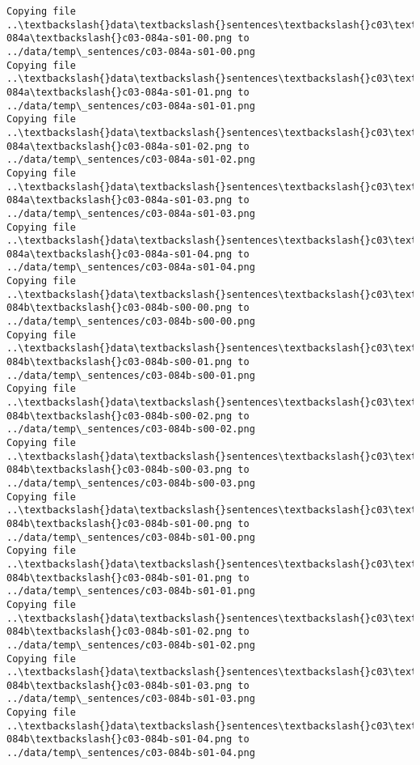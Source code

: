 \documentclass[11pt]{article}
\begin{document}
\begin{Verbatim}[commandchars=\\\{\}]
Copying file ..\textbackslash{}data\textbackslash{}sentences\textbackslash{}c03\textbackslash{}c03-084a\textbackslash{}c03-084a-s01-00.png to
../data/temp\_sentences/c03-084a-s01-00.png
Copying file ..\textbackslash{}data\textbackslash{}sentences\textbackslash{}c03\textbackslash{}c03-084a\textbackslash{}c03-084a-s01-01.png to
../data/temp\_sentences/c03-084a-s01-01.png
Copying file ..\textbackslash{}data\textbackslash{}sentences\textbackslash{}c03\textbackslash{}c03-084a\textbackslash{}c03-084a-s01-02.png to
../data/temp\_sentences/c03-084a-s01-02.png
Copying file ..\textbackslash{}data\textbackslash{}sentences\textbackslash{}c03\textbackslash{}c03-084a\textbackslash{}c03-084a-s01-03.png to
../data/temp\_sentences/c03-084a-s01-03.png
Copying file ..\textbackslash{}data\textbackslash{}sentences\textbackslash{}c03\textbackslash{}c03-084a\textbackslash{}c03-084a-s01-04.png to
../data/temp\_sentences/c03-084a-s01-04.png
Copying file ..\textbackslash{}data\textbackslash{}sentences\textbackslash{}c03\textbackslash{}c03-084b\textbackslash{}c03-084b-s00-00.png to
../data/temp\_sentences/c03-084b-s00-00.png
Copying file ..\textbackslash{}data\textbackslash{}sentences\textbackslash{}c03\textbackslash{}c03-084b\textbackslash{}c03-084b-s00-01.png to
../data/temp\_sentences/c03-084b-s00-01.png
Copying file ..\textbackslash{}data\textbackslash{}sentences\textbackslash{}c03\textbackslash{}c03-084b\textbackslash{}c03-084b-s00-02.png to
../data/temp\_sentences/c03-084b-s00-02.png
Copying file ..\textbackslash{}data\textbackslash{}sentences\textbackslash{}c03\textbackslash{}c03-084b\textbackslash{}c03-084b-s00-03.png to
../data/temp\_sentences/c03-084b-s00-03.png
Copying file ..\textbackslash{}data\textbackslash{}sentences\textbackslash{}c03\textbackslash{}c03-084b\textbackslash{}c03-084b-s01-00.png to
../data/temp\_sentences/c03-084b-s01-00.png
Copying file ..\textbackslash{}data\textbackslash{}sentences\textbackslash{}c03\textbackslash{}c03-084b\textbackslash{}c03-084b-s01-01.png to
../data/temp\_sentences/c03-084b-s01-01.png
Copying file ..\textbackslash{}data\textbackslash{}sentences\textbackslash{}c03\textbackslash{}c03-084b\textbackslash{}c03-084b-s01-02.png to
../data/temp\_sentences/c03-084b-s01-02.png
Copying file ..\textbackslash{}data\textbackslash{}sentences\textbackslash{}c03\textbackslash{}c03-084b\textbackslash{}c03-084b-s01-03.png to
../data/temp\_sentences/c03-084b-s01-03.png
Copying file ..\textbackslash{}data\textbackslash{}sentences\textbackslash{}c03\textbackslash{}c03-084b\textbackslash{}c03-084b-s01-04.png to
../data/temp\_sentences/c03-084b-s01-04.png

\end{Verbatim}
\end{document}
